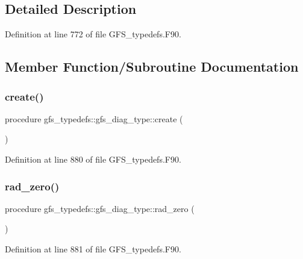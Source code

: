 \subsection{Detailed Description}


Definition at line 772 of file G\+F\+S\+\_\+typedefs.\+F90.



\subsection{Member Function/\+Subroutine Documentation}
\mbox{\label{structgfs__typedefs_1_1gfs__diag__type_ae5c5300fb021ee09f6bc4e34dff591f7}} 
\subsubsection{create()}
{\footnotesize\ttfamily procedure gfs\+\_\+typedefs\+::gfs\+\_\+diag\+\_\+type\+::create (\begin{DoxyParamCaption}{ }\end{DoxyParamCaption})}



Definition at line 880 of file G\+F\+S\+\_\+typedefs.\+F90.

\mbox{\label{structgfs__typedefs_1_1gfs__diag__type_a67d21b8dc84a43a033d57044d8b737b4}} 
\subsubsection{rad\+\_\+zero()}
{\footnotesize\ttfamily procedure gfs\+\_\+typedefs\+::gfs\+\_\+diag\+\_\+type\+::rad\+\_\+zero (\begin{DoxyParamCaption}{ }\end{DoxyParamCaption})}



Definition at line 881 of file G\+F\+S\+\_\+typedefs.\+F90.

\mbox{\label{structgfs__typedefs_1_1gfs__diag__type_ab255c9376758890574e3db7c82983368}} 
